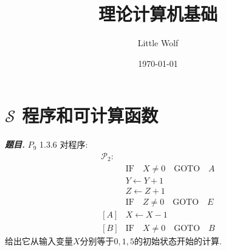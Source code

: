 \documentclass[10pt, a4paper, oneside]{ctexart}
\title{\textbf{理论计算机基础}}
\author{Little Wolf}
\date{\today}
\newenvironment{problem}{\begin{framed}\par\noindent\textbf{\textit{题目. }}}{\end{framed}\par}
\begin{document}
\maketitle

\tableofcontents
\newpage

\section{\texorpdfstring{$\mathscr{S}$ 程序和可计算函数}{S 程序和可计算函数}}

\begin{problem}
    $P_9$ 1.3.6 对程序:
    \begin{align*}
        \mathscr{P}_2:& \\
        &\text{IF}\quad X\neq 0 \quad\text{GOTO}\quad A \\
        &Y\leftarrow Y+1\\
        &Z\leftarrow Z+1 \\
        &\text{IF} \quad Z\neq 0 \quad\text{GOTO}\quad E\\
        [A]& X\leftarrow X-1\\
        [B]& \text{IF} \quad X\neq 0 \quad \text{GOTO} \quad B
    \end{align*}
    给出它从输入变量$X$分别等于$0,1,5$的初始状态开始的计算.
    \end{problem}
    
\end{document}
